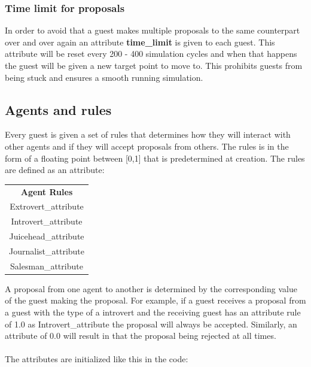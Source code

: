 \documentclass[a4paper,10pt]{article}
\begin{document}
\subsubsection{Time limit for proposals}
In order to avoid that a guest makes multiple proposals to the same counterpart over and over again an attribute \textbf{time\_limit} is given to each guest. This attribute will be reset every 200 - 400 simulation cycles and when that happens the guest will be given a new target point to move to. This prohibits guests from being stuck and ensures a smooth running simulation. 

\subsection{Agents and rules}
Every guest is given a set of rules that determines how they will interact with other agents and if they will accept proposals from others. The rules is in the form of a floating point between [0,1] that is predetermined at creation. The rules are defined as an attribute:

\begin{center}
\begin{tabular}{ |c| } 
 \hline
 \textbf{Agent Rules} \\
 Extrovert\_attribute \\
 Introvert\_attribute \\
 Juicehead\_attribute \\
 Journalist\_attribute \\
 Salesman\_attribute \\
 \hline
\end{tabular}
\end{center}

A proposal from one agent to another is determined by the corresponding value of the guest making the proposal. For example, if a guest receives a proposal from a guest with the type of a introvert and the receiving guest has an attribute rule of 1.0 as Introvert\_attribute the proposal will always be accepted. Similarly, an attribute of 0.0 will result in that the proposal being rejected at all times. \\\\ The attributes are initialized like this in the code:
\end{document}
